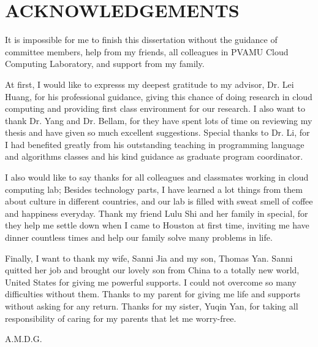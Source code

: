 %
%
%


\chapter*{ACKNOWLEDGEMENTS}

It is impossible for me to finish this dissertation without the guidance of committee members, help from my friends, all colleagues in PVAMU Cloud Computing Laboratory, and support from my family.

At first, I would like to expresss my deepest gratitude to my advisor, Dr. Lei Huang, for his professional guidance, giving this chance of doing research in cloud computing and providing first class environment for our research. I also want to thank Dr. Yang and Dr. Bellam, for they have spent lots of time on reviewing my thesis and have given so much excellent suggestions. Special thanks to Dr. Li, for I had benefited greatly from his outstanding teaching in programming language and algorithms classes and his kind guidance as graduate program coordinator.

I also would like to say thanks for all colleagues and classmates working in cloud computing lab; Besides technology parts, I have learned a lot things from them about culture in different countries, and our lab is filled with sweat smell of coffee and happiness everyday. Thank my friend Lulu Shi and her family in special, for they help me settle down when I came to Houston at first time, inviting me have dinner countless times and help our family solve many problems in life.

Finally, I want to thank my wife, Sanni Jia and my son, Thomas Yan. Sanni quitted her job and brought our lovely son from China to a totally new world, United States for giving me powerful supports. I could not overcome so many difficulties without them. Thanks to my parent for giving me life and supports without asking for any return. Thanks for my sister, Yuqin Yan, for taking all responsibility of caring for my parents that let me worry-free.   


\pagebreak{}
\vspace*{\fill}
\begin{center}
A.M.D.G.
\end{center}
\vspace*{\fill}
\pagebreak{}
